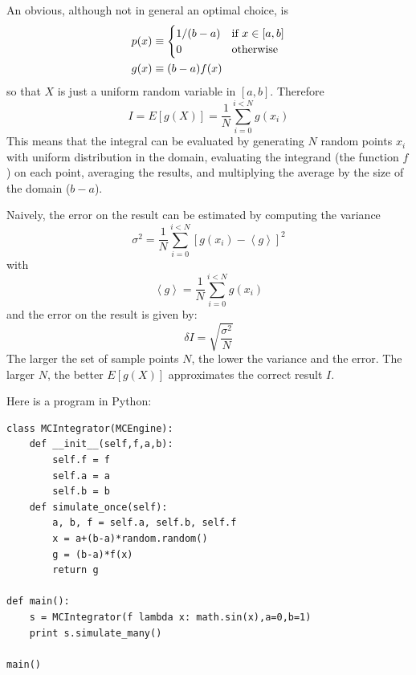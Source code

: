 \documentclass[justified,sixbynine]{tufte-book}
\def\ft{\small\tt}
\theoremstyle{plain}%
\theoremstyle{definition}
\theoremstyle{remark}
\begin{document}
\begin{fullwidth}
An obvious, although not in general an optimal choice, is
\begin{align}
\label{defchoice}
p(x) &\equiv 
\begin{cases}
1/(b-a) & \text{if }x\in [a,b] \\
0 & \text{otherwise}
\end{cases} \\
g(x) &\equiv (b-a)f(x) \notag
\end{align}
so that $X$ is just a uniform random variable in $[a,b]$. Therefore
\begin{equation}
I=E\left[ g(X)\right] =\frac1N \sum_{i=0}^{i<N}g(x_i)
\end{equation}
This means that the integral can be evaluated by generating $N$ random
points $x_i$ with uniform distribution in the domain, evaluating the
integrand (the function $f$) on each point, averaging the results, and
multiplying the average by the size of the domain ($b-a$).

Naively, the error on the result can be estimated by computing the variance
\begin{equation}
\sigma ^2 = \frac 1N\sum_{i=0}^{i<N}\left[ g(x_i)-\left\langle
g\right\rangle \right] ^2
\end{equation}
with
\begin{equation}
\left\langle g\right\rangle = \frac 1N\sum_{i=0}^{i<N}g(x_i)
\end{equation}
and the error on the result is given by:
\begin{equation}
\delta I=\sqrt{\frac{\sigma ^2}{N}}
\end{equation}
The larger the set of sample points $N$, the lower the variance and the
error. The larger $N$, the better $E[g(X)]$ approximates the correct result $%
I$.


Here is a program in Python:

\begin{lstlisting}[caption={in file: {\ft integrate.py}}]
class MCIntegrator(MCEngine):
    def __init__(self,f,a,b):
        self.f = f
        self.a = a
        self.b = b
    def simulate_once(self):
        a, b, f = self.a, self.b, self.f
        x = a+(b-a)*random.random()
        g = (b-a)*f(x)
        return g

def main():
    s = MCIntegrator(f lambda x: math.sin(x),a=0,b=1)
    print s.simulate_many()

main()
\end{lstlisting}


\end{fullwidth}
\end{document}
